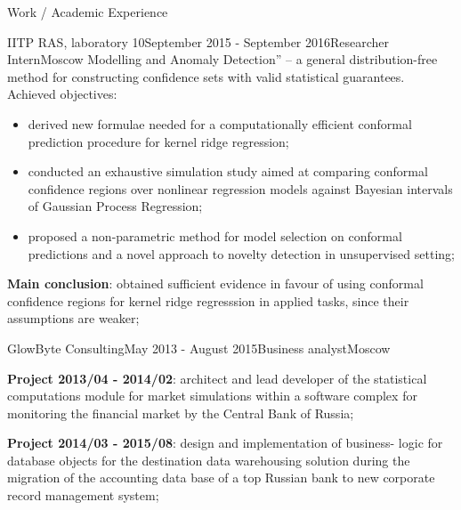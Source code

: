 \documentclass{resume} %
\begin{document}
\begin{rSection}{Work / Academic Experience}
\begin{rSubsection}{IITP RAS, laboratory 10}{September 2015 - September 2016}{Researcher Intern}{Moscow}
{    Modelling and Anomaly Detection''} -- a general distribution-free method for
    constructing confidence sets with valid statistical guarantees. Achieved objectives:
    \begin{itemize}
        \item derived new formulae needed for a computationally efficient conformal
        prediction procedure for kernel ridge regression;
        \item conducted an exhaustive simulation study aimed at comparing conformal
        confidence regions over nonlinear regression models against Bayesian intervals
        of Gaussian Process Regression;
        \item proposed a non-parametric method for model selection on conformal predictions
        and a novel approach to novelty detection in unsupervised setting;
    \end{itemize}
    \textbf{Main conclusion}: obtained sufficient evidence in favour of using conformal
    confidence regions for kernel ridge regresssion in applied tasks, since their
    assumptions are weaker; \medskip
\end{rSubsection} \medskip


\begin{rSubsection}{GlowByte Consulting}{May 2013 - August 2015}{Business analyst}{Moscow}
    \item \textbf{Project 2013/04 - 2014/02}: architect and lead developer of the
    statistical computations module for market simulations within a software complex
    for monitoring the financial market by the Central Bank of Russia;
    \item \textbf{Project 2014/03 - 2015/08}: design and implementation of business-
    logic for database objects for the destination data warehousing solution during
    the migration of the accounting data base of a top Russian bank to new corporate
    record management system;
\end{rSubsection} \medskip



\end{rSection}
\end{document}
